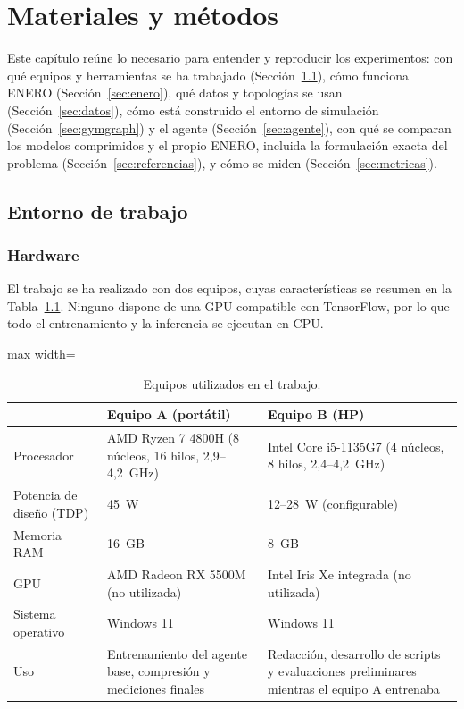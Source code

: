 \chapter{Materiales y métodos}\label{cap:mat}

Este capítulo reúne lo necesario para entender y reproducir los experimentos: con qué equipos y herramientas se ha trabajado (Sección~\ref{sec:entorno}), cómo funciona ENERO (Sección~\ref{sec:enero}), qué datos y topologías se usan (Sección~\ref{sec:datos}), cómo está construido el entorno de simulación (Sección~\ref{sec:gymgraph}) y el agente (Sección~\ref{sec:agente}), con qué se comparan los modelos comprimidos y el propio ENERO, incluida la formulación exacta del problema (Sección~\ref{sec:referencias}), y cómo se miden (Sección~\ref{sec:metricas}).

\section{Entorno de trabajo}\label{sec:entorno}

\subsection{Hardware}\label{sec:hardware}

El trabajo se ha realizado con dos equipos, cuyas características se resumen en la Tabla~\ref{tab:hardware}. Ninguno dispone de una GPU compatible con TensorFlow, por lo que todo el entrenamiento y la inferencia se ejecutan en CPU.

\begin{table}[H]
	\centering
	\small
	\begin{adjustbox}{max width=\textwidth}
	\begin{tabular}{p{2.8cm}p{4.6cm}p{4.6cm}}
		\toprule
		& \textbf{Equipo A (portátil)} & \textbf{Equipo B (HP)} \\
		\midrule
		Procesador & AMD Ryzen 7 4800H (8 núcleos, 16 hilos, 2,9--4,2~GHz) & Intel Core i5-1135G7 (4 núcleos, 8 hilos, 2,4--4,2~GHz) \\
		Potencia de diseño (TDP) & 45~W & 12--28~W (configurable) \\
		Memoria RAM & 16~GB & 8~GB \\
		GPU & AMD Radeon RX 5500M (no utilizada) & Intel Iris Xe integrada (no utilizada) \\
		Sistema operativo & Windows 11 & Windows 11 \\
		\midrule
		Uso & Entrenamiento del agente base, compresión y mediciones finales & Redacción, desarrollo de scripts y evaluaciones preliminares mientras el equipo A entrenaba \\
		\bottomrule
	\end{tabular}
	\end{adjustbox}
	\caption{Equipos utilizados en el trabajo.}
	\label{tab:hardware}
\end{table}

